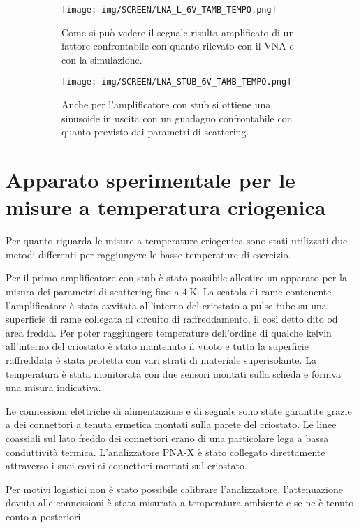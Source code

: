 \documentclass[12pt,oneside]{book}
\begin{document}
\begin{figure}[!htbp]
    \centering
    \begin{subfigure}[t]{0.48\textwidth}
        \centering
        \texttt{[image: img/SCREEN/LNA\_L\_6V\_TAMB\_TEMPO.png]}
        \caption{Come si può vedere il segnale risulta amplificato di un fattore confrontabile con quanto rilevato con il VNA e con la simulazione.}
    \end{subfigure}
    \hfill
    \begin{subfigure}[t]{0.48\textwidth}
        \centering
        \texttt{[image: img/SCREEN/LNA\_STUB\_6V\_TAMB\_TEMPO.png]}
        \caption{Anche per l'amplificatore con stub si ottiene una sinusoide in uscita con un guadagno confrontabile con quanto previsto dai parametri di scattering.}
    \end{subfigure}
    \caption{}
    \label{time_meas}
\end{figure}


\section{Apparato sperimentale per le misure a temperatura criogenica}
Per quanto riguarda le misure a temperature criogenica sono stati utilizzati due metodi differenti per raggiungere le basse temperature di esercizio.

Per il primo amplificatore con stub è stato possibile allestire un apparato per la misura dei parametri di scattering fino a $\SI{4}{\kelvin}$. La scatola di rame contenente l'amplificatore è stata avvitata all'interno del criostato a pulse tube su una superficie di rame collegata al circuito di raffreddamento, il così detto dito od area fredda.
Per poter raggiungere temperature dell'ordine di qualche kelvin all'interno del criostato è stato mantenuto il vuoto e tutta la superficie raffreddata è stata protetta con vari strati di materiale superisolante. La temperatura è stata monitorata con due sensori montati sulla scheda e forniva una misura indicativa. 

Le connessioni elettriche di alimentazione e di segnale sono state garantite grazie a dei connettori a tenuta ermetica montati sulla parete del criostato. Le linee coassiali sul lato freddo dei connettori erano di una particolare lega a bassa conduttività termica. L'analizzatore PNA-X è stato collegato direttamente attraverso i suoi cavi ai connettori montati sul criostato.

Per motivi logistici non è stato possibile calibrare l'analizzatore, l'attenuazione dovuta alle connessioni è stata misurata a temperatura ambiente e se ne è tenuto conto a posteriori.
\end{document}
